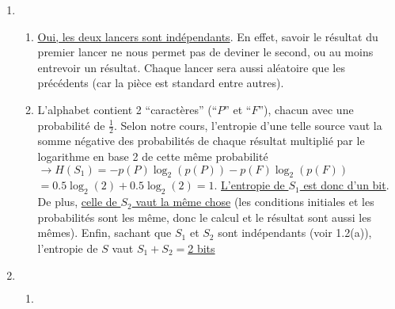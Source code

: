 \documentclass[12pt,a4paper]{article}
\begin{document}
\begin{enumerate}
	\item 
		\begin{enumerate}[label=(\alph*)]
		\item \underline{Oui, les deux lancers sont indépendants}. En effet, savoir le résultat du premier lancer ne nous permet pas de deviner le  second, ou au moins entrevoir un résultat. Chaque lancer sera aussi aléatoire que les précédents (car la pièce est standard entre autres).
		\item L'alphabet contient 2 \enquote{caractères} (\enquote{$P$} et \enquote{$F$}), chacun avec une probabilité de $\frac{1}{2}$. Selon notre cours, l'entropie d'une telle source vaut la somme négative des probabilités de chaque résultat multiplié par le logarithme en base 2 de cette même probabilité \\
			$\to H(S_1) = -p(P)\log_2(p(P)) - p(F)\log_2(p(F))$\\
			$= 0.5\log_2(2) + 0.5\log_2(2) = 1$. \underline{L'entropie de $S_1$ est donc d'un bit}. De plus, \underline{celle de $S_2$ vaut la même chose} (les conditions initiales et les probabilités sont les même, donc le calcul et le résultat sont aussi les mêmes). Enfin, sachant que $S_1$ et $S_2$ sont indépendants (voir 1.2(a)), l'entropie de $S$ vaut $S_1 + S_2 =$\underline{2 bits}
		\end{enumerate}
		\newpage
	\item ${}$
	\begin{enumerate}[label=(\alph*)]
		\item${}$
			\begin{center}
\end{center}
\end{enumerate}
\end{enumerate}
\end{document}
